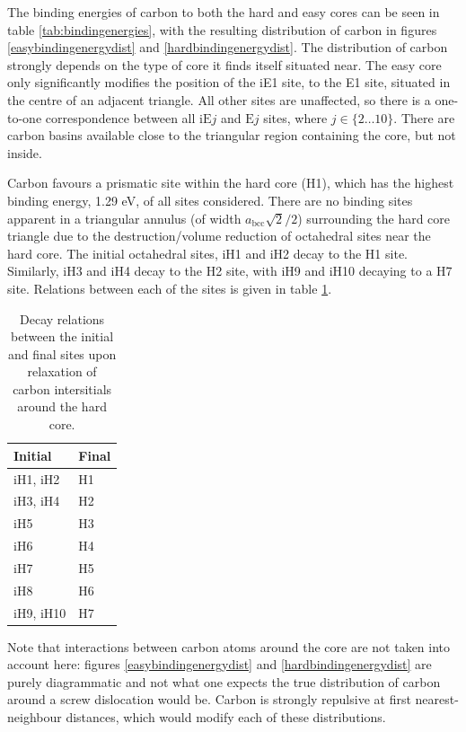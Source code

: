 \documentclass[a4paper,11pt]{article}
\begin{document}
The binding energies of carbon to both the hard and easy cores can be seen in table
\ref{tab:bindingenergies}, with the resulting distribution of carbon in figures
\ref{easybindingenergydist} and \ref{hardbindingenergydist}. The distribution of carbon strongly
depends on the type of core it finds itself situated near. The easy core only significantly
modifies the position of the iE1 site, to the E1 site, situated in the centre of an adjacent
triangle. All other sites are unaffected, so there is a one-to-one correspondence between all
\(\text{iE}j\) and \(\text{E}j\) sites, where \(j \in \{2\dots10\}\). There are carbon basins available close
to the triangular region containing the core, but not inside.

Carbon favours a prismatic site within the hard core (H1), which has the highest
binding energy, 1.29 eV, of all sites considered. There are no binding sites apparent in a triangular
annulus (of width \(a_{\text{bcc}}\sqrt{2}/2\)) surrounding the hard core triangle due to the
destruction/volume reduction of octahedral sites near the hard core. The initial octahedral
sites, iH1 and iH2 decay to the H1 site. Similarly, iH3 and iH4 decay to the H2 site, with iH9
and iH10 decaying to a H7 site. Relations between each of the sites is given in table
\ref{decayrelations}.


\begin{table}[htbp]
\caption{Decay relations between the initial and final sites upon relaxation of carbon intersitials around the hard core. \label{decayrelations}}
\centering
\begin{tabular}{ll}
Initial & Final\\
\hline
iH1, iH2 & H1\\
iH3, iH4 & H2\\
iH5 & H3\\
iH6 & H4\\
iH7 & H5\\
iH8 & H6\\
iH9, iH10 & H7\\
\end{tabular}
\end{table}


Note that interactions between carbon atoms around the core are not taken into account here:
figures \ref{easybindingenergydist} and \ref{hardbindingenergydist} are purely diagrammatic and not
what one expects the true distribution of carbon around a screw dislocation would be. Carbon is strongly
repulsive at first nearest-neighbour distances, which would modify each of these
distributions. 
\end{document}
